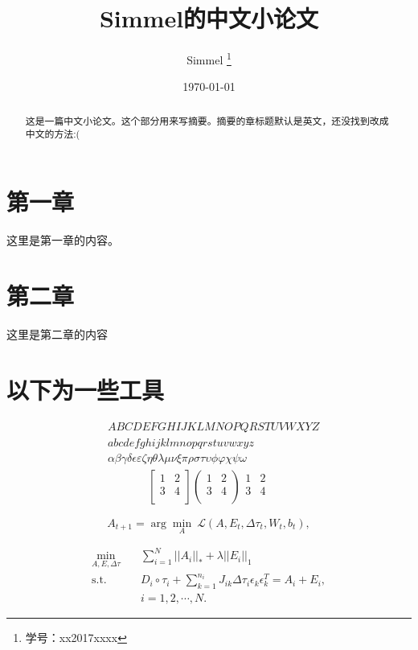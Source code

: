 \documentclass[UTF8,a4paper,10pt]{ctexart}
\title{\textbf{Simmel的中文小论文}}
\author{ Simmel \thanks{学号：xx2017xxxx} }
\date{\today}
\begin{document}
    \maketitle
 
 
\begin{abstract}
这是一篇中文小论文。这个部分用来写摘要。摘要的章标题默认是英文，还没找到改成中文的方法:(
\end{abstract}
 
 
\section*{第一章}
这里是第一章的内容。
 
 
\section{第二章}
这里是第二章的内容
 
 
\section{以下为一些工具}
    \begin{align}
		& ABCDEFGHIJKLMNOPQRSTUVWXYZ \label{eq:alphabet} \\
		& abcdefghijklmnopqrstuvwxyz \\
	& \alpha \beta \gamma \delta \epsilon \varepsilon \zeta \eta \theta \lambda \mu \nu \xi \pi \rho \sigma \tau \upsilon \phi \varphi \chi \psi \omega  
	\end{align}
    \begin{align}
	 \begin{bmatrix}
		1 & 2 \\
		3 & 4 \\
	\end{bmatrix}
	 \begin{pmatrix}
	1 & 2 \\
	3 & 4 \\
	\end{pmatrix}
	 \begin{matrix}
	1 & 2 \\
	3 & 4 \\
	\end{matrix}
	\end{align}
 
    \begin{equation}
	A_{t+1} = \arg\min_A \ \mathcal{L}(A,E_t,\Delta\tau_t,W_t,b_t), \nonumber
	\end{equation}
 
    \begin{equation}
	\begin{aligned} \label{eq:rasl}
	\min_{A,E,\Delta \tau} \quad & \sum_{i=1}^{N}||A_i||_* + \lambda ||E_i||_1  \\
	\mathrm{s.t.} \quad & D_i \circ \tau_i + \sum_{k=1}^{n_i} J_{ik} \Delta \tau_i \epsilon_k \epsilon_k^T = A_i + E_i, \\
	& i = 1,2,\cdots,N. 
	\end{aligned}
	\end{equation}
 
\end{document}
